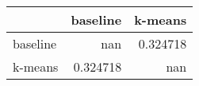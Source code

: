 \begin{tabular}{lrr}
\toprule
          &   baseline &    k-means \\
\midrule
 baseline & nan        &   0.324718 \\
 k-means  &   0.324718 & nan        \\
\bottomrule
\end{tabular}
